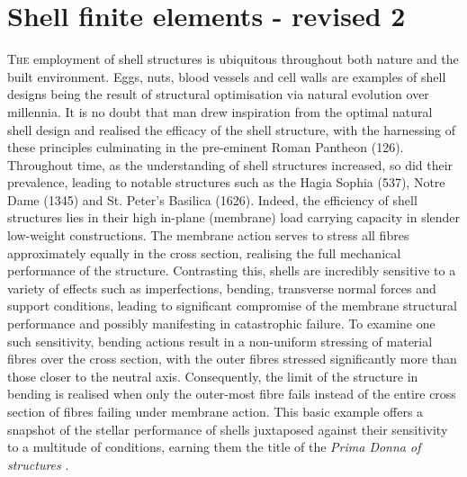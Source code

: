 



\chapter{Shell finite elements - revised 2}
\label{chap:chapter_2}

\renewcommand{\Thema}{Shell finite elements}

\lettrine[lines=2]{T}{he} employment of shell structures is ubiquitous throughout both nature and the built environment. Eggs, nuts, blood vessels and cell walls are examples of shell designs being the result of structural optimisation via natural evolution over millennia. It is no doubt that man drew inspiration from the optimal natural shell design and realised the efficacy of the shell structure, with the harnessing of these principles culminating in the pre-eminent Roman Pantheon (126).  Throughout time, as the understanding of shell structures increased, so did their prevalence, leading to notable structures such as the Hagia Sophia (537), Notre Dame (1345) and St. Peter's Basilica (1626). Indeed, the efficiency of shell structures lies in their high in-plane (membrane) load carrying capacity in slender low-weight constructions. The membrane action serves to stress all fibres approximately equally in the cross section, realising the full mechanical performance of the structure. Contrasting this, shells are incredibly sensitive to a variety of effects such as imperfections, bending, transverse normal forces and support conditions, leading to significant compromise of the membrane structural performance and possibly manifesting in catastrophic failure. To examine one such sensitivity, bending actions result in a non-uniform stressing of material fibres over the cross section, with the outer fibres stressed significantly more than those closer to the neutral axis. Consequently, the limit of the structure in bending is realised when only the outer-most fibre fails instead of the entire cross section of fibres failing under membrane action. This basic example offers a snapshot of the stellar performance of shells juxtaposed against their sensitivity to a multitude of conditions, earning them the title of the \textit{Prima Donna of structures} \cite{Ram16}.

